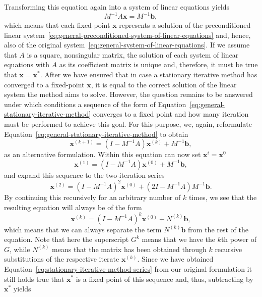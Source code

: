 Transforming this equation again into a system of linear equations yields
\begin{equation*}
	M^{-1} A \bm{x} = M^{-1}\bm b,
\end{equation*}
which means that each fixed-point $\bm{x}$ represents a solution of the preconditioned linear system~\eqref{eq:general-preconditioned-system-of-linear-equations} and, hence, also of the original system~\eqref{eq:general-system-of-linear-equations}.
If we assume that $A$ is a square, nonsingular matrix, the solution of each system of linear equations with $A$ as its coefficient matrix is unique and, therefore, it must be true that $\bm{x} = \bm{x}^{*}$.
After we have ensured that in case a stationary iterative method has converged to a fixed-point $\bm{x}$, it is equal to the correct solution of the linear system the method aims to solve.
However, the question remains to be answered under which conditions a sequence of the form of Equation~\eqref{eq:general-stationary-iterative-method} converges to a fixed point and how many iteration must be performed to achieve this goal.
For this purpose, we, again, reformulate Equation~\eqref{eq:general-stationary-iterative-method} to obtain
\begin{equation}
	\bm{x}^{(k+1)} = (I - M^{-1} A) \bm{x}^{(k)} + M^{-1}\bm b,
\end{equation}
as an alternative formulation.
Within this equation can now set $\bm{x}^{i} = \bm{x}^{0}$ 
\begin{equation}
	\bm{x}^{(1)} = (I - M^{-1} A) \bm{x}^{(0)} + M^{-1}\bm b,
\end{equation}
and expand this sequence to the two-iteration series
\begin{equation}
	\bm{x}^{(2)} = (I - M^{-1} A)^2 \bm{x}^{(0)} + (2I - M^{-1} A)M^{-1} \bm{b}.
\end{equation}
By continuing this recursively for an arbitrary number of $k$ times, we see that the resulting equation will always be of the form
\begin{equation}
	\bm{x}^{(k)} = (I - M^{-1} A)^k \bm{x}^{(0)} + N^{(k)}\bm{b},
	\label{eq:stationary-iterative-method-series}
\end{equation}
which means that we can always separate the term $N^{(k)}\bm{b}$ from the rest of the equation.
Note that here the superscript $G^k$ means that we have the $k$th power of $G$, while $N^{(k)}$ means that the matrix has been obtained through $k$ recursive substitutions of the respective iterate $\bm{x}^{(k)}$.
Since we have obtained Equation~\eqref{eq:stationary-iterative-method-series} from our original formulation it still holds true that $\bm{x}^{*}$ is a fixed point of this sequence and, thus, subtracting by $\bm{x}^{*}$ yields
